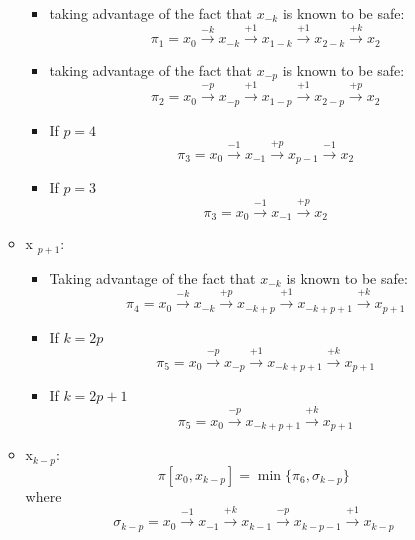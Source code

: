 \begin{itemize}
\begin{itemize}
\begin{itemize}
\item  taking advantage of the fact that $x_{-k}$ is known to be safe: 
$$ \pi_{1}  =   x_{0}\xrightarrow {-k}x_{-k} \xrightarrow {+1}x_{1-k}\xrightarrow {+1}x_{2-k}\xrightarrow {+k}x_{2}$$
\item  taking advantage of the fact that $x_{-p}$ is known to be safe: 
$$ \pi_{2}  =   x_{0}\xrightarrow {-p} x_{-p} \xrightarrow {+1}x_{1-p}\xrightarrow {+1}x_{2-p}\xrightarrow {+p} x_{2}$$
\item If  $p = 4$ %
$$ \pi_3  =   x_{0}\xrightarrow {-1}x_{-1} \xrightarrow {+p}x_{p-1}\xrightarrow {-1}x_{2}$$
\item If $p = 3$ %
$$   \pi_3 =  x_{0}\xrightarrow {-1}x_{-1} \xrightarrow {+p}x_{2}$$
\end{itemize}
\item x $_ {p+1}$:


 \begin{itemize} 
\item Taking advantage of the fact that $x_{-k}$ is known to be safe:
$$ \pi_{4} = x_{0} \xrightarrow {-k} x_{-k} \xrightarrow {+p} x_{-k+p}\xrightarrow {+1} x_{-k+p+1}\xrightarrow {+k} x_{p+1} $$



 \item If $k=2p$
$$ \pi_5 = x_{0} \xrightarrow {-p} x_{-p} \xrightarrow {+1} x_{-k+p+1}\xrightarrow {+k} x_{p+1} $$

\item  If $k=2p+1$
$$ \pi_5 = x_{0} \xrightarrow {-p} x_{-k+p+1} \xrightarrow {+k} x_{p+1} $$
\end{itemize}


 \item x$_ {k-p}$: %
$$ \pi[x_0,x_{k-p}] = \min \{ \pi_6, \sigma_{k-p}\}$$
where
$$\sigma_{k-p} =x_{0} \xrightarrow {-1} x_{-1} \xrightarrow {+k} x_{k-1} \xrightarrow {-p} x_{k-p-1}\xrightarrow {+1} x_ {k-p}$$


\end{itemize}
\end{itemize}

